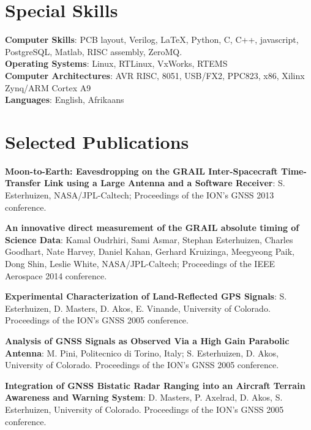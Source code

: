 \begin{resume}
\section{\sc Special Skills}
{\bf Computer Skills}: PCB layout, Verilog, \LaTeX, Python, C, C++, javascript, PostgreSQL, Matlab,
	RISC assembly, ZeroMQ.\\ 
{\bf Operating Systems}: Linux, RTLinux, VxWorks, RTEMS\\
{\bf Computer Architectures}: AVR RISC, 8051, USB/FX2, PPC823, x86, Xilinx Zynq/ARM Cortex A9\\
{\bf Languages}: English, Afrikaans


\section{\sc Selected Publications}
{\bf Moon-to-Earth: Eavesdropping on the GRAIL Inter-Spacecraft Time-Transfer Link using a Large Antenna and a Software Receiver}: S. Esterhuizen, NASA/JPL-Caltech; Proceedings of the ION's GNSS 2013 conference.

{\bf An innovative direct measurement of the GRAIL absolute timing of Science Data}: Kamal Oudrhiri, Sami Asmar, Stephan Esterhuizen, Charles Goodhart, Nate Harvey, Daniel Kahan, Gerhard Kruizinga, Meegyeong Paik, Dong Shin, Leslie White, NASA/JPL-Caltech; Proceedings of the IEEE Aerospace 2014 conference.

{\bf Experimental Characterization of Land-Reflected GPS Signals}: S. Esterhuizen, D. Masters, D. Akos, E. Vinande, University of Colorado. Proceedings of the ION's GNSS 2005 conference.

{\bf Analysis of GNSS Signals as Observed Via a High Gain Parabolic Antenna}: M. Pini, Politecnico di Torino, Italy; S. Esterhuizen, D. Akos, University of Colorado. Proceedings of the ION's GNSS 2005 conference.

{\bf Integration of GNSS Bistatic Radar Ranging into an Aircraft Terrain Awareness and Warning System}: D. Masters, P. Axelrad, D. Akos, S. Esterhuizen, University of Colorado. Proceedings of the ION's GNSS 2005 conference.


\end{resume}
